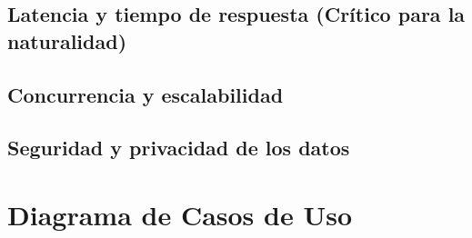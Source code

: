 \textoBase

\subsection{Latencia y tiempo de respuesta (Crítico para la naturalidad)}
\label{subsec:latencia_respuesta}

\textoBaseAlt

\subsection{Concurrencia y escalabilidad}
\label{subsec:concurrencia_escalabilidad}

\textoBase

\subsection{Seguridad y privacidad de los datos}
\label{subsec:seguridad_privacidad}

\textoBaseAlt

\section{Diagrama de Casos de Uso}
\label{sec:casos_uso}

\textoBase

